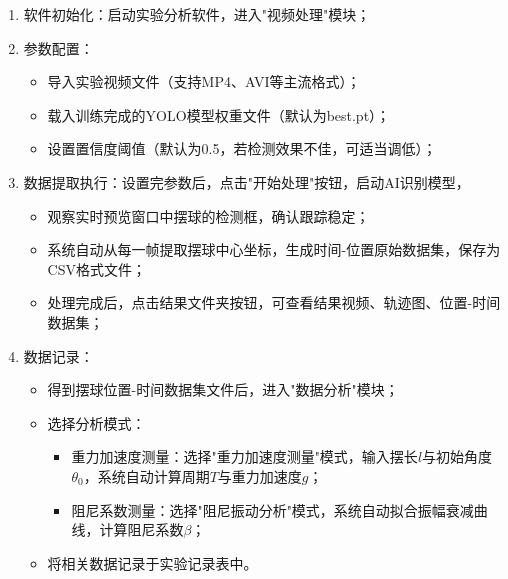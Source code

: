 \begin{enumerate}[leftmargin=*]
    \item 软件初始化：启动实验分析软件，进入"视频处理"模块；
    
    \item 参数配置：
    \begin{itemize}
        \item 导入实验视频文件（支持MP4、AVI等主流格式）；
        \item 载入训练完成的YOLO模型权重文件（默认为best.pt）；
        \item 设置置信度阈值（默认为0.5，若检测效果不佳，可适当调低）；
    \end{itemize}
    
    \item 数据提取执行：设置完参数后，点击"开始处理"按钮，启动AI识别模型，
    \begin{itemize}
        \item 观察实时预览窗口中摆球的检测框，确认跟踪稳定；
        \item 系统自动从每一帧提取摆球中心坐标，生成时间-位置原始数据集，保存为CSV格式文件；
        \item 处理完成后，点击结果文件夹按钮，可查看结果视频、轨迹图、位置-时间数据集；
    \end{itemize}

    \item 数据记录：
    \begin{itemize}
        \item 得到摆球位置-时间数据集文件后，进入"数据分析"模块；
        \item 选择分析模式：
        \begin{itemize}
            \item 重力加速度测量：选择"重力加速度测量"模式，输入摆长$l$与初始角度$\theta_0$，系统自动计算周期$T$与重力加速度$g$；
            \item 阻尼系数测量：选择"阻尼振动分析"模式，系统自动拟合振幅衰减曲线，计算阻尼系数$\beta$；
        \end{itemize}
        \item 将相关数据记录于实验记录表中。
    \end{itemize}   
\end{enumerate} 

